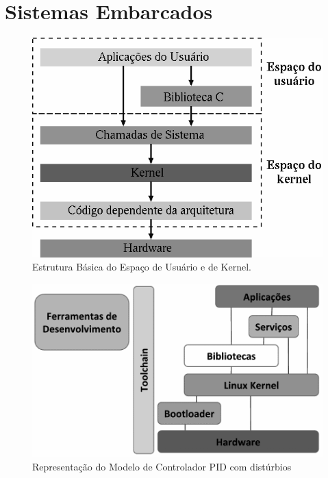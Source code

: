 \section{Sistemas Embarcados}

\begin{figure}[!ht]
  \caption{Estrutura Básica do Espaço de Usuário e de Kernel.}
  \begin{center}
      \includegraphics[scale=0.75]{img/kernel_user_space}
  \end{center}
  \label{fig:kernel_user_space}
\end{figure}
  
\begin{figure}[!ht]
  \caption{Representação do Modelo de Controlador PID com distúrbios}
  \begin{center}
      \includegraphics[scale=0.35]{img/sistema-linux-overview_embarcados}
  \end{center}
  \label{fig:sistema-linux-overview_embarcados}
\end{figure}


